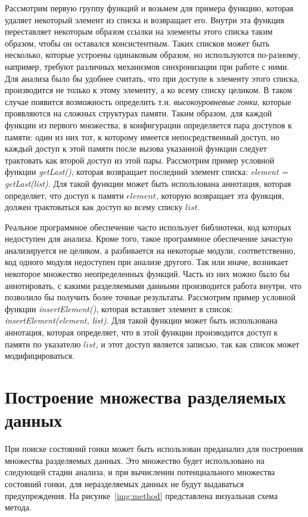 Рассмотрим первую группу функций и возьмем для примера функцию, которая удаляет некоторый элемент из списка и возвращает его.
Внутри эта функция переставляет некоторым образом ссылки на элементы этого списка таким образом, чтобы он оставался консистентным.
Таких списков может быть несколько, которые устроены одинаковым образом, но используются по-разному, например, требуют различных механизмов синхронизации при работе с ними. 
Для анализа было бы удобнее считать, что при доступе к элементу этого списка, производится не только к этому элементу, а ко всему списку целиком. 
В таком случае появится возможность определить т.н. \textit{высокоуровневые гонки}, которые проявляются на сложных структурах памяти.
Таким образом, для каждой функции из первого множества, в конфигурации определяется пара доступов к памяти: один из них тот, к которому имеется непосредственный доступ, но каждый доступ к этой памяти после вызова указанной функции следует трактовать как второй доступ из этой пары.
Рассмотрим пример условной функции \textit{getLast()}, которая возвращает последний элемент списка: \textit{element = getLast(list)}.
Для такой функции может быть использована аннотация, которая определяет, что доступ к памяти $element$, которую возвращает эта функция, должен трактоваться как доступ ко всему списку $list$. 

Реальное программное обеспечение часто использует библиотеки, код которых недоступен для анализа.
Кроме того, такое программное обеспечение зачастую анализируется не целиком, а разбивается на некоторые модули, соответственно, код одного модуля недоступен при анализе другого.
Так или иначе, возникает некоторое множество неопределенных функций.
Часть из них можно было бы аннотировать, с какими разделяемыми данными производится работа внутри, что позволило бы получить более точные результаты.
Рассмотрим пример условной функции \textit{insertElement()}, которая вставляет элемент в список: \textit{insertElement(element, list)}.
Для такой функции может быть использована аннотация, которая определяет, что в этой функции производится доступ к памяти по указателю $list$, и этот доступ является записью, так как список может модифицироваться.


\section{Построение множества разделяемых данных}
\label{sect_shared_analysis}
При поиске состояний гонки может быть использован преданализ для построения множества разделяемых данных.
Это множество будет использовано на следующей стадии анализа, и при вычислении потенциального множества состояний гонки, для неразделяемых данных не будут выдаваться предупреждения.
На рисунке~\ref{img:method} представлена визуальная схема метода.

